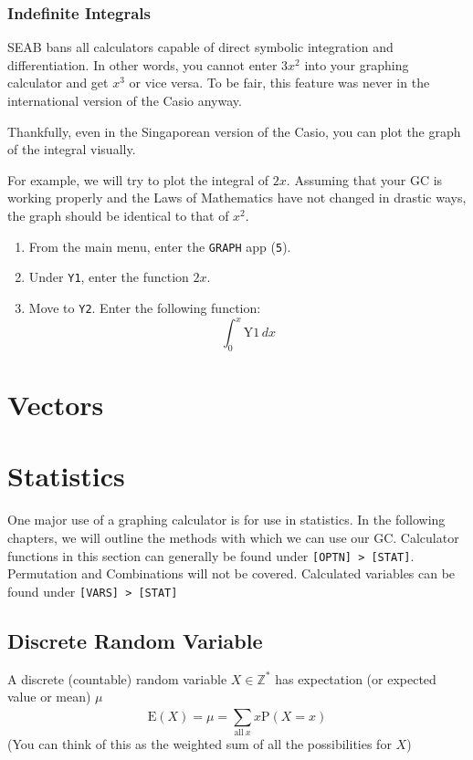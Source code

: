 \documentclass[a5paper,draft]{memoir}
\def\code#1{\texttt{#1}}
\begin{document}
\subsection{Indefinite Integrals}
SEAB bans all calculators capable of direct symbolic integration and differentiation. In other words, you cannot enter $3x^2$ into your graphing calculator and get $x^3$ or vice versa. To be fair, this feature was never in the international version of the Casio anyway.

Thankfully, even in the Singaporean version of the Casio, you can plot the graph of the integral visually.

For example, we will try to plot the integral of $2x$. Assuming that your GC is working properly and the Laws of Mathematics have not changed in drastic ways, the graph should be identical to that of $x^2$.

\begin{enumerate}
	\item From the main menu, enter the \code{GRAPH} app (\code{5}).
	\item Under \code{Y1}, enter the function $2x$.
	\item Move to \code{Y2}. Enter the following function:
	\begin{equation*}
	\int_{0}^{x} \text{Y}1 \, dx
	\end{equation*}
\end{enumerate}

\chapter{Vectors} \label{vectors}

\chapter{Statistics}
One major use of a graphing calculator is for use in statistics. In the following chapters, we will outline the methods with which we can use our GC. Calculator functions in this section can generally be found under \code{[OPTN] > [STAT]}. Permutation and Combinations will not be covered. Calculated variables can be found under \code{[VARS] > [STAT]}

\section{Discrete Random Variable}
A discrete (countable) random variable $X \in \mathbb{Z}^*$ has expectation (or expected value or mean) $\mu$
\begin{equation}
	\mathrm{E}(X)=\mu=\sum_{\mathrm{all}~x}^{}x\mathrm{P}(X=x)
\end{equation}
(You can think of this as the weighted sum of all the possibilities for $X$)
\end{document}
